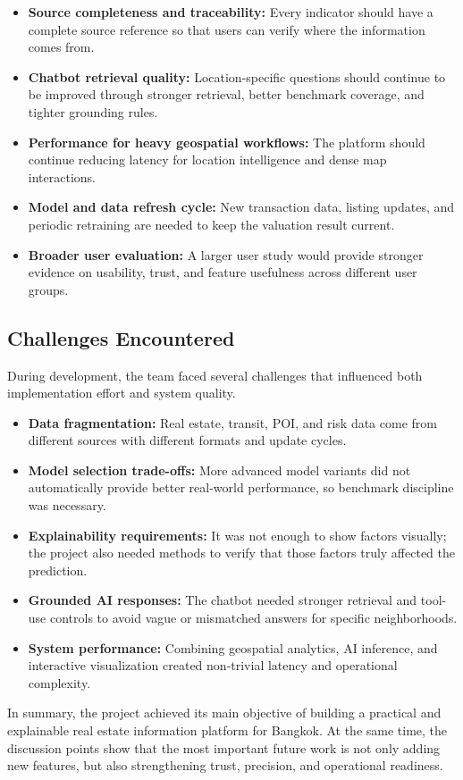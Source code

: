 \begin{itemize}
    \item \textbf{Source completeness and traceability:} Every indicator should have a complete source reference so that users can verify where the information comes from.
    \item \textbf{Chatbot retrieval quality:} Location-specific questions should continue to be improved through stronger retrieval, better benchmark coverage, and tighter grounding rules.
    \item \textbf{Performance for heavy geospatial workflows:} The platform should continue reducing latency for location intelligence and dense map interactions.
    \item \textbf{Model and data refresh cycle:} New transaction data, listing updates, and periodic retraining are needed to keep the valuation result current.
    \item \textbf{Broader user evaluation:} A larger user study would provide stronger evidence on usability, trust, and feature usefulness across different user groups.
\end{itemize}

\subsection{Challenges Encountered}
During development, the team faced several challenges that influenced both implementation effort and system quality.

\begin{itemize}
    \item \textbf{Data fragmentation:} Real estate, transit, POI, and risk data come from different sources with different formats and update cycles.
    \item \textbf{Model selection trade-offs:} More advanced model variants did not automatically provide better real-world performance, so benchmark discipline was necessary.
    \item \textbf{Explainability requirements:} It was not enough to show factors visually; the project also needed methods to verify that those factors truly affected the prediction.
    \item \textbf{Grounded AI responses:} The chatbot needed stronger retrieval and tool-use controls to avoid vague or mismatched answers for specific neighborhoods.
    \item \textbf{System performance:} Combining geospatial analytics, AI inference, and interactive visualization created non-trivial latency and operational complexity.
\end{itemize}

In summary, the project achieved its main objective of building a practical and explainable real estate information platform for Bangkok. At the same time, the discussion points show that the most important future work is not only adding new features, but also strengthening trust, precision, and operational readiness.
